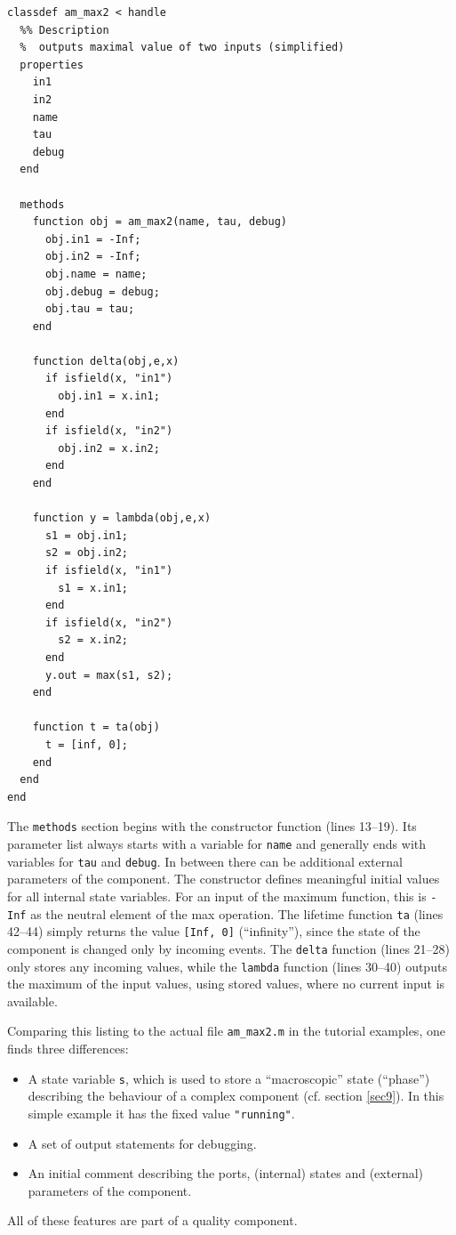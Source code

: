 \documentclass[12pt,oneside,a4paper,bibtotoc,BCOR=0pt,DIV=20]{scrreprt}
\newcommand{\cft}[1]{\mbox{\texttt{#1}}}   %
\newcommand{\defi}[1]{``#1''}
\begin{document}
\begin{lstlisting}[caption={Simplified code of \cft{am\_max2.m}.},captionpos=b,label=lst3]
classdef am_max2 < handle
  %% Description
  %  outputs maximal value of two inputs (simplified)
  properties
    in1
    in2
    name
    tau
    debug
  end

  methods
    function obj = am_max2(name, tau, debug)
      obj.in1 = -Inf;
      obj.in2 = -Inf;
      obj.name = name;
      obj.debug = debug;
      obj.tau = tau;
    end

    function delta(obj,e,x)
      if isfield(x, "in1")
        obj.in1 = x.in1;
      end
      if isfield(x, "in2")
        obj.in2 = x.in2;
      end
    end

    function y = lambda(obj,e,x)
      s1 = obj.in1;
      s2 = obj.in2;
      if isfield(x, "in1")
        s1 = x.in1;
      end
      if isfield(x, "in2")
        s2 = x.in2;
      end
      y.out = max(s1, s2);
    end

    function t = ta(obj)
      t = [inf, 0];
    end
  end
end
\end{lstlisting}

The \cft{methods} section begins with the constructor function (lines
13--19). Its parameter list always starts with a variable for \cft{name} and
generally ends with variables for \cft{tau} and \cft{debug}. In between there
can be additional external parameters of the component. The constructor defines
meaningful initial values for all internal state variables. For an input of the
maximum function, this is \cft{-Inf} as the neutral element of the max
operation. The lifetime function \cft{ta} (lines 42--44) simply returns the
value \cft{[Inf, 0]} (\defi{infinity}), since the state of the component is
changed only by incoming events. The \cft{delta} function (lines 21--28) only
stores any incoming values, while the \cft{lambda} function (lines 30--40)
outputs the maximum of the input values, using stored values, where no current
input is available.

Comparing this listing to the actual file \cft{am\_max2.m} in the tutorial
examples, one finds three differences:
\begin{itemize}
\item A state variable \cft{s}, which is used to store a \defi{macroscopic}
  state (\defi{phase}) describing the behaviour of a complex component
  (cf. section \ref{sec9}). In this simple example it has the fixed value
  \cft{"running"}.
\item A set of output statements for debugging.
\item An initial comment describing the ports, (internal) states and (external)
  parameters of the component.
\end{itemize}
All of these features are part of a quality component.
\end{document}
